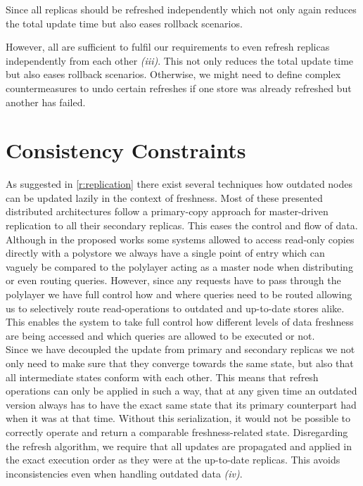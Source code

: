 Since all replicas should be refreshed independently which not only again reduces the total update time but also eases rollback scenarios.


However, all are sufficient to fulfil our requirements to even refresh replicas independently from each other \textit{(iii)}.
This not only reduces the total update time but also eases rollback scenarios. 
Otherwise, we might need to define complex countermeasures to undo certain refreshes if one store was already refreshed but another has failed.








\section{Consistency Constraints}
\label{sec:consistency_concept}

As suggested in \ref{r:replication} there exist several techniques how outdated nodes can be updated lazily in the context of freshness.
Most of these presented distributed architectures follow a primary-copy approach for master-driven replication to all their secondary replicas.
This eases the control and flow of data. Although in the proposed works some systems allowed to access read-only copies directly
with a polystore we always have a single point of entry which can vaguely be compared to the polylayer acting as a master node
when distributing or even routing queries. However, since any requests have to pass through the polylayer
we have full control how and where queries need to be routed allowing us to selectively route read-operations to outdated and up-to-date stores alike.
This enables the system to take full control how different levels of data freshness are being accessed and which queries are allowed to be executed or not.\\


Since we have decoupled the update from primary and secondary replicas we not only need to make sure that they converge towards the same state, but also that 
all intermediate states conform with each other. This means that refresh operations can only be applied in such a way, that at any given time an outdated version always has
to have the exact same state that its primary counterpart had when it was at that time. Without this serialization, it would not be possible to correctly operate and return 
a comparable freshness-related state. 
Disregarding the refresh algorithm, we require that all updates are propagated and applied in the exact execution order as they were at the up-to-date 
replicas. This avoids inconsistencies even when handling outdated data \textit{(iv)}.\\

